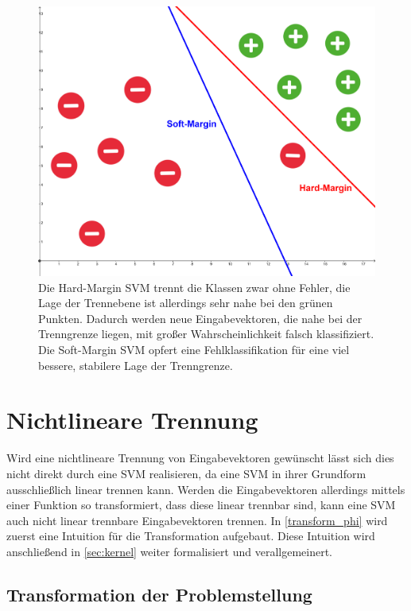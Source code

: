 \documentclass[a4paper,11pt,twoside]{scrreprt}
\begin{document}
\begin{figure}[H]
	\centering
	\includegraphics[width = 13cm]{assets/hard_vs_soft_margin.png}
	\caption{Die Hard-Margin \ac{SVM} trennt die Klassen zwar ohne Fehler, die Lage der Trennebene ist allerdings sehr nahe bei den grünen Punkten. Dadurch werden neue Eingabevektoren, die nahe bei der Trenngrenze liegen, mit großer Wahrscheinlichkeit falsch klassifiziert. Die Soft-Margin SVM \glqq{}opfert\grqq{} eine Fehlklassifikation für eine viel bessere, stabilere Lage der Trenngrenze.}
	\label{fig:hard_vs_soft_svm}
\end{figure}






\chapter{Nichtlineare Trennung}

Wird eine nichtlineare Trennung von Eingabevektoren gewünscht lässt sich dies nicht direkt durch eine \ac{SVM} realisieren, da eine \ac{SVM} in ihrer Grundform ausschließlich linear trennen kann. Werden die Eingabevektoren allerdings mittels einer Funktion so transformiert, dass diese linear trennbar sind, kann eine \ac{SVM} auch nicht linear trennbare Eingabevektoren trennen. In \autoref{transform_phi} wird zuerst eine Intuition für die Transformation aufgebaut. Diese Intuition wird anschließend in \autoref{sec:kernel} weiter formalisiert und verallgemeinert. 

\section{Transformation der Problemstellung} \label{transform_phi}
\end{document}

